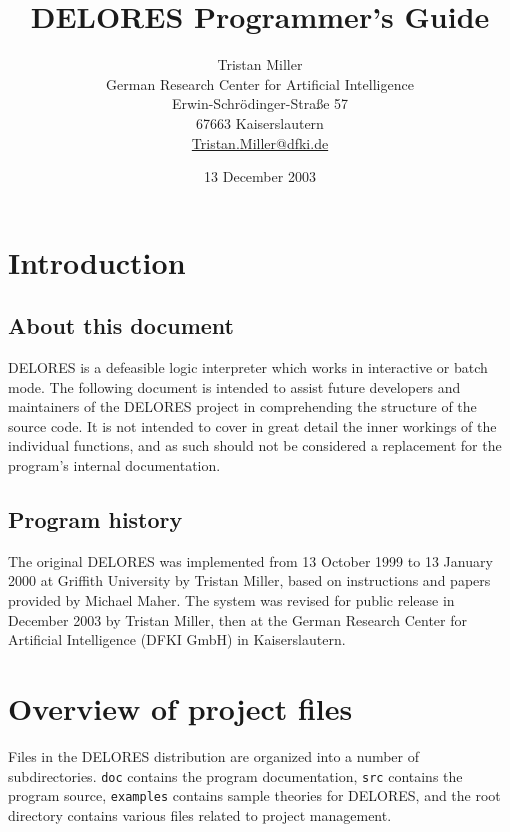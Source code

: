 \documentclass[a4paper,10pt,twocolumn]{article}
\begin{document}
\title{DELORES Programmer's Guide}
\author{Tristan Miller\\
German Research Center for Artificial Intelligence\\
Erwin-Schr\"odinger-Stra{\ss}e 57\\
67663 Kaiserslautern\\
\url{Tristan.Miller@dfki.de}}
\date{13 December 2003}
\maketitle
\tableofcontents

\section{Introduction}
\subsection{About this document}

DELORES is a defeasible logic interpreter which works in interactive
or batch mode. The following document is intended to assist future
developers and maintainers of the DELORES project in comprehending the
structure of the source code. It is not intended to cover in great
detail the inner workings of the individual functions, and as such
should not be considered a replacement for the program's internal
documentation.

\subsection{Program history}

The original DELORES was implemented from 13 October 1999 to 13
January 2000 at Griffith University by Tristan Miller, based on
instructions and papers provided by Michael Maher. The system was
revised for public release in December 2003 by Tristan Miller, then at
the German Research Center for Artificial Intelligence (DFKI GmbH) in
Kaisers\-lautern.

\section{Overview of project files}

Files in the DELORES distribution are organized into a number of
subdirectories.  \texttt{doc} contains the program documentation,
\texttt{src} contains the program source, \texttt{examples} contains
sample theories for DELORES, and the root directory contains various
files related to project management.
\end{document}
